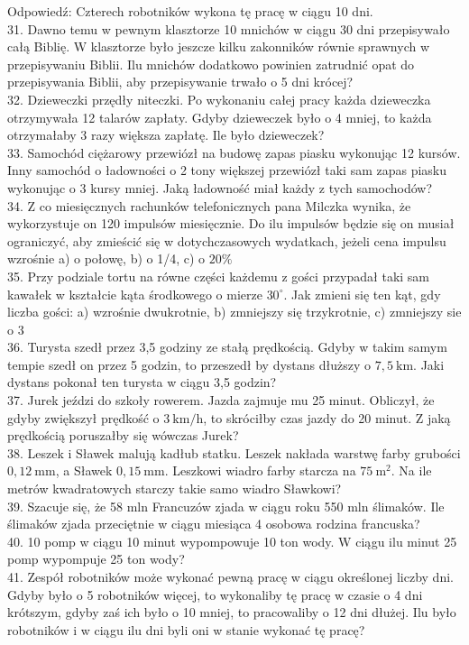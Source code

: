 \documentclass[10pt]{article}
\begin{document}
Odpowiedź: Czterech robotników wykona tę pracę w ciągu 10 dni.\\
31. Dawno temu w pewnym klasztorze 10 mnichów w ciągu 30 dni przepisywało całą Biblię. W klasztorze było jeszcze kilku zakonników równie sprawnych w przepisywaniu Biblii. Ilu mnichów dodatkowo powinien zatrudnić opat do przepisywania Biblii, aby przepisywanie trwało o 5 dni krócej?\\
32. Dzieweczki przędły niteczki. Po wykonaniu całej pracy każda dzieweczka otrzymywała 12 talarów zapłaty. Gdyby dzieweczek było o 4 mniej, to każda otrzymałaby 3 razy większa zapłatę. Ile było dzieweczek?\\
33. Samochód ciężarowy przewiózł na budowę zapas piasku wykonując 12 kursów. Inny samochód o ładowności o 2 tony większej przewiózł taki sam zapas piasku wykonując o 3 kursy mniej. Jaką ładowność miał każdy z tych samochodów?\\
34. Z co miesięcznych rachunków telefonicznych pana Milczka wynika, że wykorzystuje on 120 impulsów miesięcznie. Do ilu impulsów będzie się on musiał ograniczyć, aby zmieścić się w dotychczasowych wydatkach, jeżeli cena impulsu wzrośnie a) o połowę, b) o 1/4, c) o \(20 \%\)\\
35. Przy podziale tortu na równe części każdemu z gości przypadał taki sam kawałek w kształcie kąta środkowego o mierze \(30^{\circ}\). Jak zmieni się ten kąt, gdy liczba gości: a) wzrośnie dwukrotnie, b) zmniejszy się trzykrotnie, c) zmniejszy sie o 3\\
36. Turysta szedł przez 3,5 godziny ze stałą prędkością. Gdyby w takim samym tempie szedł on przez 5 godzin, to przeszedł by dystans dłuższy o \(7,5 \mathrm{~km}\). Jaki dystans pokonał ten turysta w ciągu 3,5 godzin?\\
37. Jurek jeździ do szkoły rowerem. Jazda zajmuje mu 25 minut. Obliczył, że gdyby zwiększył prędkość o \(3 \mathrm{~km} / \mathrm{h}\), to skróciłby czas jazdy do 20 minut. Z jaką prędkością poruszałby się wówczas Jurek?\\
38. Leszek i Sławek malują kadłub statku. Leszek nakłada warstwę farby grubości \(0,12 \mathrm{~mm}\), a Sławek \(0,15 \mathrm{~mm}\). Leszkowi wiadro farby starcza na \(75 \mathrm{~m}^{2}\). Na ile metrów kwadratowych starczy takie samo wiadro Sławkowi?\\
39. Szacuje się, że 58 mln Francuzów zjada w ciągu roku 550 mln ślimaków. Ile ślimaków zjada przeciętnie w ciągu miesiąca 4 osobowa rodzina francuska?\\
40. 10 pomp w ciągu 10 minut wypompowuje 10 ton wody. W ciągu ilu minut 25 pomp wypompuje 25 ton wody?\\
41. Zespół robotników może wykonać pewną pracę w ciągu określonej liczby dni. Gdyby było o 5 robotników więcej, to wykonaliby tę pracę w czasie o 4 dni krótszym, gdyby zaś ich było o 10 mniej, to pracowaliby o 12 dni dłużej. Ilu było robotników i w ciągu ilu dni byli oni w stanie wykonać tę pracę?
\end{document}
